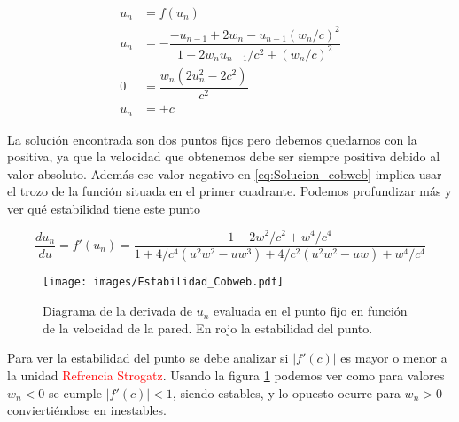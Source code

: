 \documentclass[11pt, spanish]{book}
\begin{document}
\begin{align}
    u_n &= f(u_n) \nonumber\\
    u_n &= -\dfrac{-u_{n-1} + 2w_n - u_{n-1}(w_n/c)^2}{1 - 2w_n u_{n-1}/c^2 + (w_n/c)^2}\label{eq:Solucion_cobweb} \\
    0 &= \dfrac{w_n\left( 2u_n^2-2c^2 \right)}{c^2} \nonumber\\
    u_n &= \pm c \label{eq:Solucion_cobweb,valor}
\end{align}

\vspace{3mm}

La solución encontrada son dos puntos fijos pero debemos quedarnos con la positiva, ya que la velocidad que obtenemos debe ser siempre positiva debido al valor absoluto. Además ese valor negativo en \ref{eq:Solucion_cobweb} implica usar el trozo de la función situada en el primer cuadrante. Podemos profundizar más y ver qué estabilidad tiene este punto

\begin{equation}
    \dfrac{du_n}{du} = f'(u_n) = \dfrac{1 - 2w^2/c^2 + w^4/c^4}{1 + 4/c^4\left( u^2w^2-uw^3 \right) + 4/c^2\left( u^2w^2-uw \right) + w^4/c^4}
\end{equation}

\begin{figure}[H]
    \centering
    \texttt{[image: images/Estabilidad\_Cobweb.pdf]}
    \caption{Diagrama de la derivada de $u_n$ evaluada en el punto fijo en función de la velocidad de la pared. En rojo la estabilidad del punto.}
    \label{fig:estabilidad_cobweb}
\end{figure}

\vspace{3mm}

Para ver la estabilidad del punto se debe analizar si \( \left| f'(c) \right| \) es mayor o menor a la unidad \textcolor{red}{Refrencia Strogatz}. Usando la figura \ref{fig:estabilidad_cobweb} podemos ver como para valores \( w_n < 0 \) se cumple \( \left| f'(c) \right| < 1 \), siendo estables, y lo opuesto ocurre para \( w_n > 0 \) conviertiéndose en inestables.

\vspace{3mm}
\end{document}
